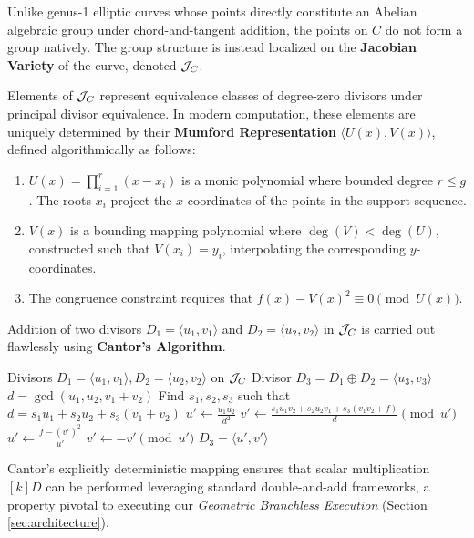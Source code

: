 Unlike genus-1 elliptic curves whose points directly constitute an Abelian algebraic group under chord-and-tangent addition, the points on $C$ do not form a group natively. The group structure is instead localized on the \textbf{Jacobian Variety} of the curve, denoted $\mathcal{J}_C$.

Elements of $\mathcal{J}_C$ represent equivalence classes of degree-zero divisors under principal divisor equivalence. In modern computation, these elements are uniquely determined by their \textbf{Mumford Representation} $\langle U(x), V(x) \rangle$, defined algorithmically as follows:
\begin{enumerate}
    \item $U(x) = \prod_{i=1}^r (x - x_i)$ is a monic polynomial where bounded degree $r \le g$. The roots $x_i$ project the $x$-coordinates of the points in the support sequence.
    \item $V(x)$ is a bounding mapping polynomial where $\deg(V) < \deg(U)$, constructed such that $V(x_i) = y_i$, interpolating the corresponding $y$-coordinates.
    \item The congruence constraint requires that $f(x) - V(x)^2 \equiv 0 \pmod{U(x)}$.
\end{enumerate}

Addition of two divisors $D_1 = \langle u_1, v_1 \rangle$ and $D_2 = \langle u_2, v_2 \rangle$ in $\mathcal{J}_C$ is carried out flawlessly using \textbf{Cantor's Algorithm}. 
\begin{algorithm}[H]
\caption{Cantor's Algorithm for Jacobian Addition}\label{alg:cantor}
\begin{algorithmic}[1]
\Require Divisors $D_1 = \langle u_1, v_1 \rangle, D_2 = \langle u_2, v_2 \rangle$ on $\mathcal{J}_C$
\Ensure Divisor $D_3 = D_1 \oplus D_2 = \langle u_3, v_3 \rangle$
\State $d = \gcd(u_1, u_2, v_1 + v_2)$
\State Find $s_1, s_2, s_3$ such that $d = s_1u_1 + s_2u_2 + s_3(v_1 + v_2)$
\State $u' \gets \frac{u_1 u_2}{d^2}$
\State $v' \gets \frac{s_1 u_1 v_2 + s_2 u_2 v_1 + s_3(v_1 v_2 + f)}{d} \pmod{u'}$
    \State $u' \gets \frac{f - (v')^2}{u'}$ 
    \State $v' \gets -v' \pmod{u'}$
\EndWhile
\State \Return $D_3 = \langle u', v' \rangle$
\end{algorithmic}
\end{algorithm}

Cantor's explicitly deterministic mapping ensures that scalar multiplication $[k]D$ can be performed leveraging standard double-and-add frameworks, a property pivotal to executing our \textit{Geometric Branchless Execution} (Section \ref{sec:architecture}).

